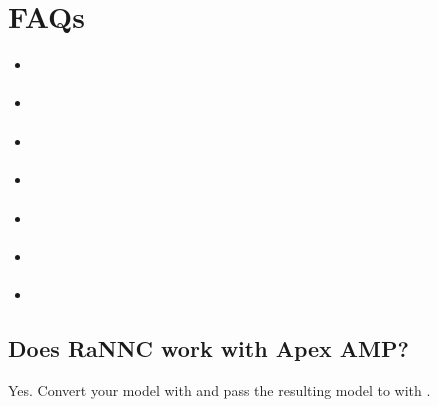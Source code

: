 \documentclass[letterpaper,10pt,english]{sphinxmanual}
\begin{document}
\chapter{FAQs}
\label{\detokenize{faq:faqs}}\label{\detokenize{faq::doc}}
\begin{sphinxShadowBox}
\begin{itemize}
\item {} 
\label{\detokenize{faq:id1}}{\hyperref[\detokenize{faq:does-rannc-work-with-apex-amp}]{}}

\item {} 
\label{\detokenize{faq:id2}}{\hyperref[\detokenize{faq:how-to-save-load-a-rannc-module}]{}}

\item {} 
\label{\detokenize{faq:id3}}{\hyperref[\detokenize{faq:how-to-use-gradient-accumulation}]{}}

\item {} 
\label{\detokenize{faq:id4}}{\hyperref[\detokenize{faq:my-model-takes-too-long-until-partitioning-is-determined}]{}}

\item {} 
\label{\detokenize{faq:id5}}{\hyperref[\detokenize{faq:custom-cpp-functions-does-not-work-with-rannc}]{}}

\item {} 
\label{\detokenize{faq:id6}}{\hyperref[\detokenize{faq:how-to-use-a-model-that-takes-kwargs}]{}}

\item {} 
\label{\detokenize{faq:id7}}{\hyperref[\detokenize{faq:does-rannc-work-with-torch-distributed-package}]{}}

\end{itemize}
\end{sphinxShadowBox}


\section{Does RaNNC work with Apex AMP?}
\label{\detokenize{faq:does-rannc-work-with-apex-amp}}
Yes.
Convert your model with  and pass
the resulting model to  with .
\end{document}
